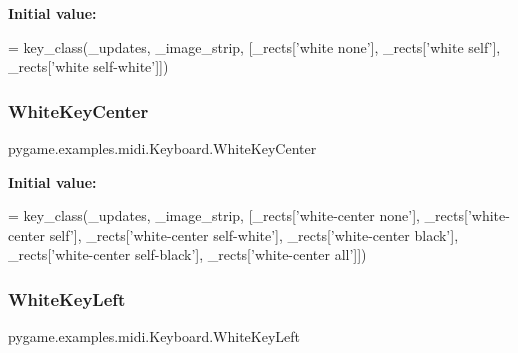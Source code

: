 {\bfseries Initial value\+:}
\begin{DoxyCode}
=  key\_class(\_updates,
                         \_image\_strip,
                         [\_rects[\textcolor{stringliteral}{'white none'}],
                          \_rects[\textcolor{stringliteral}{'white self'}],
                          \_rects[\textcolor{stringliteral}{'white self-white'}]])
\end{DoxyCode}
\mbox{\label{classpygame_1_1examples_1_1midi_1_1_keyboard_adfc1e6d510352851f99575a6e9707b76}} 
\subsubsection{\texorpdfstring{White\+Key\+Center}{WhiteKeyCenter}}
{\footnotesize\ttfamily pygame.\+examples.\+midi.\+Keyboard.\+White\+Key\+Center\hspace{0.3cm}{\ttfamily [static]}}

{\bfseries Initial value\+:}
\begin{DoxyCode}
=  key\_class(\_updates,
                               \_image\_strip,
                               [\_rects[\textcolor{stringliteral}{'white-center none'}],
                                \_rects[\textcolor{stringliteral}{'white-center self'}],
                                \_rects[\textcolor{stringliteral}{'white-center self-white'}],
                                \_rects[\textcolor{stringliteral}{'white-center black'}],
                                \_rects[\textcolor{stringliteral}{'white-center self-black'}],
                                \_rects[\textcolor{stringliteral}{'white-center all'}]])
\end{DoxyCode}
\mbox{\label{classpygame_1_1examples_1_1midi_1_1_keyboard_a6d2fc4a2723dd7992e532ac17767c3fb}} 
\subsubsection{\texorpdfstring{White\+Key\+Left}{WhiteKeyLeft}}
{\footnotesize\ttfamily pygame.\+examples.\+midi.\+Keyboard.\+White\+Key\+Left\hspace{0.3cm}{\ttfamily [static]}}

